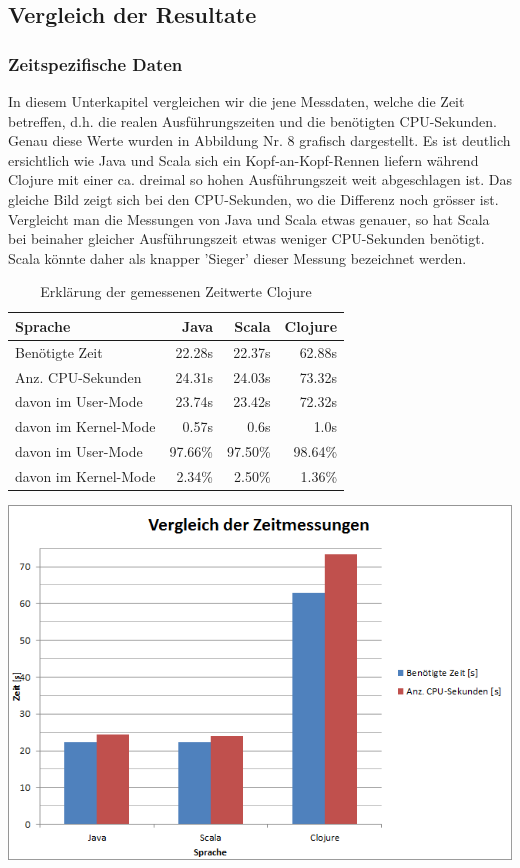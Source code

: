 \documentclass{fancydocument}
\begin{document}
\subsection{Vergleich der Resultate}
\subsubsection{Zeitspezifische Daten}
In diesem Unterkapitel vergleichen wir die jene Messdaten, welche die Zeit betreffen, d.h. die realen Ausführungszeiten und die benötigten CPU-Sekunden. Genau diese Werte wurden in Abbildung Nr. 8 grafisch dargestellt. Es ist deutlich ersichtlich wie Java und Scala sich ein Kopf-an-Kopf-Rennen liefern während Clojure mit einer ca. dreimal so hohen Ausführungszeit weit abgeschlagen ist. Das gleiche Bild zeigt sich bei den CPU-Sekunden, wo die Differenz noch grösser ist. Vergleicht man die Messungen von Java und Scala etwas genauer, so hat Scala bei beinaher gleicher Ausführungszeit etwas weniger CPU-Sekunden benötigt. Scala könnte daher als knapper 'Sieger' dieser Messung bezeichnet werden.
\begin{table}[h!]
\centering
\begin{tabular}{|p{6cm}|r|r|r|} \hline
Sprache & Java & Scala & Clojure \\
\hline
Benötigte Zeit & 22.28s & 22.37s & 62.88s\\
\hline
Anz. CPU-Sekunden & 24.31s & 24.03s & 73.32s\\
\hline
davon im User-Mode & 23.74s & 23.42s & 72.32s\\
\hline
davon im Kernel-Mode & 0.57s & 0.6s & 1.0s\\
\hline
davon im User-Mode & 97.66\% & 97.50\% & 98.64\%\\
\hline
davon im Kernel-Mode & 2.34\% & 2.50\% & 1.36\%\\
\hline
\end{tabular}
\caption{Erklärung der gemessenen Zeitwerte Clojure}
\end{table}
\begin{center}
\includegraphics[width=\linewidth]{bilder/TimeAll.png}
\end{center}
\end{document}
